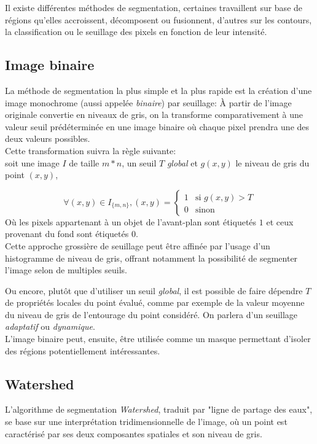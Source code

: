 \documentclass[a4paper,12pt]{report}
\begin{document}
Il existe différentes méthodes de segmentation, certaines travaillent sur base de régions qu'elles accroissent, décomposent ou fusionnent, d'autres sur les contours, la classification ou le seuillage des pixels en fonction de leur intensité.\\
\subsection{Image binaire}
La méthode de segmentation la plus simple et la plus rapide est la création d'une image monochrome (aussi appelée \textit{binaire}) par seuillage: \`A partir de l'image originale convertie en niveaux de gris, on la transforme comparativement à une valeur seuil prédéterminée en une image binaire où chaque pixel prendra une des deux valeurs possibles.\\
Cette transformation suivra la règle suivante:\\
soit une image $I$ de taille $m*n$, un seuil $T$ \textit{global} et $g(x,y)$ le niveau de gris du point $(x,y)$,

$$ \forall (x,y) \in I_{\{m,n\}}, (x,y) = \left\{ 
\begin{array}{rl}
1 &\mbox{si } g(x,y)>T\\
0 &\mbox{sinon}
\end{array} \right.
$$ 
Où les pixels appartenant à un objet de l'avant-plan sont étiquetés $1$ et ceux provenant du fond sont étiquetés $0$.\\ 
Cette approche grossière de seuillage peut être affinée par l'usage d'un histogramme de niveau de gris, offrant notamment la possibilité de segmenter l'image selon de multiples seuils. 

Ou encore, plutôt que d'utiliser un seuil \textit{global}, il est possible de faire dépendre $T$ de propriétés locales du point évalué, comme par exemple de la valeur moyenne du niveau de gris de l'entourage du point considéré. On parlera d'un seuillage \textit{adaptatif} ou \textit{dynamique}.\\

L'image binaire peut, ensuite, être utilisée comme un masque permettant d'isoler des régions potentiellement intéressantes.

\subsection{Watershed}
L'algorithme de segmentation \textit{Watershed}, traduit par "ligne de partage des eaux", se base sur une interprétation tridimensionnelle de l'image, où un point est caractérisé par ses deux composantes spatiales et son niveau de gris.
\end{document}
